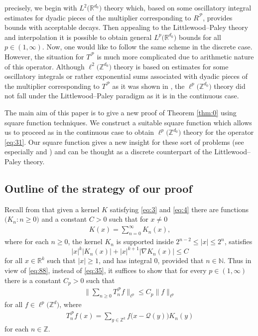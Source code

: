 \documentclass[a4paper,oneside]{amsart}
\theoremstyle{plain}
\theoremstyle{definition}
\numberwithin{equation}{section}
\newcounter{thm}
\theoremstyle{plain}
\newcommand{\RR}{\mathbb{R}}
\newcommand{\ZZ}{\mathbb{Z}}
\newcommand{\NN}{\mathbb{N}}
\newcommand{\calP}{\mathcal{P}}
\newcommand{\calQ}{\mathcal{Q}}
\newcommand{\seq}[2]{{#1}: {#2}}
\newcommand{\norm}[1]{{\left\lvert #1 \right\rvert}}
\newcommand{\abs}[1]{{\lvert {#1} \rvert}}
\newcommand{\8}{\infty}
\begin{document}
precisely, we begin with $L^2\big(\RR^{d_0}\big)$ theory which, based
on some oscillatory integral estimates for dyadic pieces of the
multiplier corresponding to $R^{\calP}$, provides bounds with
acceptable decays.  Then appealing to the Littlewood--Paley theory and
interpolation it is possible to obtain general
$L^p\big(\RR^{d_0}\big)$ bounds for all $p\in(1, \infty)$.
Now, one would like to follow the same scheme in the discrete
case. However, the situation for $T^{\calP}$ is much more complicated
due to arithmetic nature of this operator. Although
$\ell^2\big(\ZZ^{d_0}\big)$ theory is based on estimates for some
oscillatory integrals or rather exponential sums associated with dyadic pieces of the multiplier
corresponding to $T^{\calP}$ as it was shown in \cite{iw}, the
$\ell^p\big(\ZZ^{d_0}\big)$ theory did not fall under the
Littlewood--Paley paradigm as it is in the continuous case.

The main aim of this paper is to give a new proof of Theorem \ref{thm:0} using
square function techniques. We construct a suitable square function
which allows us to proceed as in the continuous case to obtain
$\ell^p\big(\ZZ^{d_0}\big)$ theory for the operator \eqref{eq:31}.
Our square function gives a new insight for these sort of problems
(see especially \cite{mst1} and \cite{mst2}) and
can be thought as a discrete counterpart of the Littlewood--Paley
theory.

\subsection{Outline of the strategy of our proof} Recall from \cite[Chapter 6, \S4.5, Chapter 13, \S5.3]{bigs} that
given a kernel $K$ satisfying \eqref{eq:3} and \eqref{eq:4} there are functions 
$\big(\seq{K_n}{n \geq 0}\big)$ and a constant $C > 0$ such that for $x \neq 0$
\begin{align}
\label{eq:87}
K(x) = \sum_{n = 0}^\infty K_n(x),  
\end{align}
where for each $n \geq 0$, the kernel $K_n$ is supported inside $2^{n-2} \leq \norm{x} \leq 2^n$,
satisfies
\begin{equation}
	\label{eq:88}
	\norm{x}^k \abs{K_n(x)} + \norm{x}^{k+1} \norm{\nabla K_n(x)} \leq C
\end{equation}
for all $x \in \RR^k$ such that $\norm{x} \geq 1$, and has integral
$0$, provided that $n \in\NN$. Thus in view of \eqref{eq:88}, instead
of \eqref{eq:35}, it suffices to show that for every $p\in(1, \infty)$
there is a constant $C_p>0$ such that
\begin{align}
  \label{eq:89}
\Big\|\sum_{n\ge0}T_n^{\calP}f\Big\|_{\ell^p}\le C_p\|f\|_{\ell^p}  
\end{align}
for all $f\in\ell^p\big(\ZZ^d\big)$, where
\begin{align}
  \label{eq:90}
T_n^{\calP} f(x)
=
\sum_{y\in\ZZ^k} f\big(x - \calQ(y)\big) K_n(y)    
\end{align}
for each $n\in\ZZ$.
\end{document}
